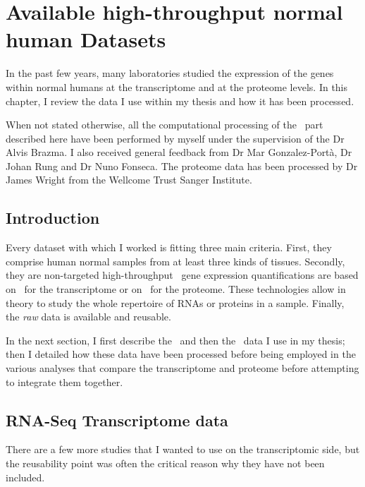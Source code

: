 \chapter{Available high-throughput normal human Datasets}
\label{ch:datasets}

\begin{comment}
\setlength{\epigraphwidth}{0.57\textwidth}
\setlength{\epigraphrule}{0.1pt}
\epigraph{Data! Data! Data! I can’t make bricks without clay!}{Sherlock Homes
    (Sir Arthur Conan Doyle)}
\end{comment}

In the past few years, many laboratories studied the expression
of the genes within normal humans at the transcriptome and at
the proteome levels. In this chapter, I review the data I use within my thesis
and how it has been processed.

When not stated otherwise, all the computational processing of the \Rnaseq\ part
described here have been performed by myself under the supervision of
the Dr Alvis Brazma. I also received general feedback from Dr Mar Gonzalez-Portà,
Dr Johan Rung and Dr Nuno Fonseca. The proteome data has been processed by
Dr James Wright from the Wellcome Trust Sanger Institute.


\section{Introduction}

Every dataset with which I worked is fitting three main criteria.
First, they comprise human normal samples from at least three kinds of tissues.
Secondly, they are non-targeted high-throughput \ie\ gene expression
quantifications are based on \Rnaseq\ for the transcriptome or on \ms\ for the
proteome. These technologies allow in theory to study the whole repertoire of
\glspl{RNA} or proteins in a sample.
Finally, the \emph{raw} data is available and reusable.

In the next section, I first describe the \Rnaseq\ and then the \ms\ data I use
in my thesis; then I detailed how these data have been processed before being
employed in the various analyses that compare the transcriptome and proteome
before attempting to integrate them together.


\section{RNA-Seq Transcriptome data}

There are a few more studies that I wanted to use on the
transcriptomic side, but the reusability point was often the critical reason
why they have not been included.

